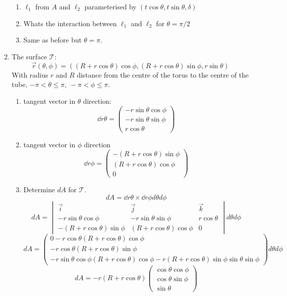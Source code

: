 \documentclass{E:/Documents/Latex/myassignment}
\begin{document}
\begin{enumerate}
\begin{enumerate}
		\item $\ell_1$ from $A$ and $\ell_2$ parameterised by $(t\cos\theta, t\sin\theta, \delta)$
		\item Whats the interaction between $\ell_1$ and $\ell_2$ for $\theta = \pi/2$
		\item Same as before but $\theta = \pi$.
	\end{enumerate}
	\item The surface $\mathcal{T}$:
	\[\vec r(\theta,\phi) = \left((R + r\cos\theta) \cos\phi, (R+r\cos\theta) \sin\phi,r\sin\theta\right)\]
	With radius $r$ and $R$ distance from the centre of the torus to the centre of the tube, $-\pi < \theta \leq \pi, \ -\pi < \phi \leq \pi$.
	\begin{enumerate}
		\item tangent vector in $\theta$ direction:
		\[\dd{r}{\theta} = \begin{pmatrix}
			-r\sin\theta\cos\phi\\-r\sin\theta\sin\phi\\ r\cos\theta
		\end{pmatrix}\]		
		\item tangent vector in $\phi$ direction
		\[\dd{r}{\phi} = \begin{pmatrix}
			-(R+r\cos\theta)\sin\phi \\ (R+r\cos\theta)\cos\phi\\0
		\end{pmatrix}\]
		\item Determine $dA$ for $\mathcal{T}$.
		\[	dA = \dd r\theta \times \dd r\phi d\theta d\phi\]
		\[dA = \begin{vmatrix}
			\vec i & \vec j &\vec k \\
			-r\sin\theta\cos\phi&-r\sin\theta\sin\phi& r\cos\theta\\
			-(R+r\cos\theta)\sin\phi & (R+r\cos\theta)\cos\phi&0
		\end{vmatrix}d\theta d\phi\]
		\[dA = \begin{pmatrix}
			0 - r\cos\theta(R+r\cos\theta)\cos\phi\\
			-r\cos\theta (R+r\cos\theta)\sin\phi\\
			-r\sin\theta\cos\phi (R+r\cos\theta)\cos\phi - r(R+r\cos\theta)\sin\phi \sin\theta\sin\phi
		\end{pmatrix}d\theta d\phi\]
		\[dA = - r(R+r\cos\theta)\begin{pmatrix}
			\cos\theta\cos\phi\\
			\cos\theta\sin\phi\\
			\sin\theta

\end{pmatrix}\]
\end{enumerate}
\end{enumerate}
\end{document}
